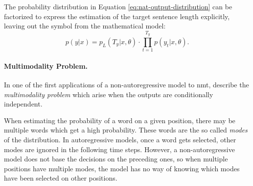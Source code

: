 The probability distribution in Equation \ref{eq:nat-output-distribution} can
be factorized to express the estimation of the target sentence length
explicitly, leaving out the \eos{} symbol from the mathematical model:
\begin{equation}
  p(y|x) = p_L(T_y|x, \theta) \cdot \prod_{t=1}^{T_y}p(y_t|x,\theta).
  \label{eq:explicit-length}
\end{equation}




\citep{ghazvininejad2019mask} \citep{mansimov2019generalized}

\paragraph{Multimodality Problem.} In one of the first applications of a
non-autoregressive model to \ac{nmt}, \citet{gu2017nonautoregressive} describe
the \emph{multimodality problem} which arise when the outputs are conditionally
independent.

When estimating the probability of a word on a given position, there may be
multiple words which get a high probability. These words are the so called
\emph{modes} of the distribution. In autoregressive models, once a word gets
selected, other modes are ignored in the following time steps. However, a
non-autoregressive model does not base the decisions on the preceding ones, so
when multiple positions have multiple modes, the model has no way of knowing
which modes have been selected on other positions.

